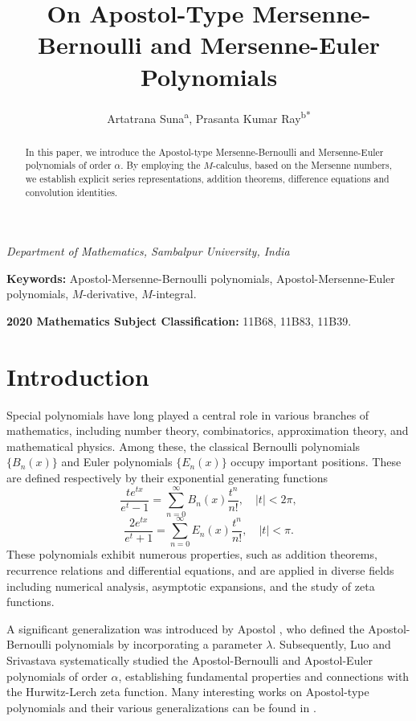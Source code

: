 \documentclass[12pt, a4paper]{article}
\title{On Apostol-Type Mersenne-Bernoulli and Mersenne-Euler Polynomials}
\author{%
  Artatrana Suna\textsuperscript{a},
  Prasanta Kumar Ray\textsuperscript{b}\textsuperscript{*}%
}
\date{}
\theoremstyle{definition}
\numberwithin{equation}{section}
\begin{document}
\maketitle

\vspace{-2.5em}

\begin{center}
  \textit{Department of Mathematics, Sambalpur University, India}
\end{center}

\begin{abstract}
In this paper, we introduce the Apostol-type Mersenne-Bernoulli and Mersenne-Euler polynomials of order $\alpha$. By employing the $M$-calculus, based on the Mersenne numbers, we establish explicit series representations, addition theorems, difference equations and convolution identities.
\end{abstract}

\noindent\textbf{Keywords:} Apostol-Mersenne-Bernoulli polynomials, Apostol-Mersenne-Euler polynomials, $M$-derivative, $M$-integral.

\noindent\textbf{2020 Mathematics Subject Classification:} 11B68, 11B83, 11B39.

\begingroup
  \renewcommand{\thefootnote}{\alph{footnote}}
\endgroup

\section{Introduction}
Special polynomials have long played a central role in various branches of mathematics, including number theory, combinatorics, approximation theory, and mathematical physics. Among these, the classical Bernoulli polynomials $\{B_n(x)\}$ and Euler polynomials $\{E_n(x)\}$ occupy important positions. These are defined respectively by their exponential generating functions \cite{abramowitz1974handbook}
\[
\frac{t e^{tx}}{e^t-1}=\sum_{n=0}^\infty B_n(x)\frac{t^n}{n!},\quad |t|<2\pi,
\]
\[
\frac{2e^{tx}}{e^t+1}=\sum_{n=0}^\infty E_n(x)\frac{t^n}{n!},\quad |t|<\pi.
\]
These polynomials exhibit numerous properties, such as addition theorems, recurrence relations and differential equations, and are applied in diverse fields including numerical analysis, asymptotic expansions, and the study of zeta functions.

A significant generalization was introduced by Apostol \cite{apostol1951lerch}, who defined the Apostol-Bernoulli polynomials by incorporating a parameter $\lambda$. Subsequently, Luo and Srivastava \cite{luo2005some} systematically studied the Apostol-Bernoulli and Apostol-Euler polynomials of order $\alpha$, establishing fundamental properties and connections with the Hurwitz-Lerch zeta function. Many interesting works on Apostol-type polynomials and their various generalizations can be found in \cite{luo2005some, luo2006some, ozarslan2011unified}.
\end{document}
